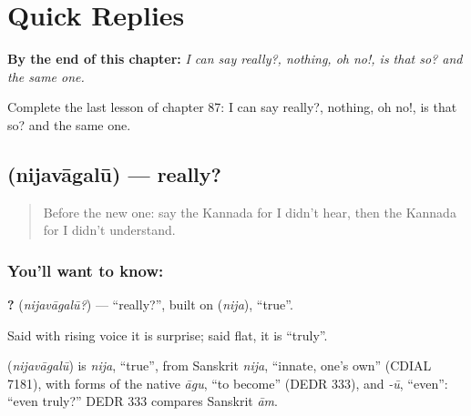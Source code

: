 
\chapter{Quick Replies}
\label{ch:ka-quick-replies}

\begin{chapteropening}
\textbf{By the end of this chapter:} \emph{I can say really?, nothing, oh no!, is that so? and the same one.}

Complete the last lesson of chapter 87: I can say really?, nothing, oh no!, is that so? and the same one.
\end{chapteropening}

\section[\texorpdfstring{\kn{ನಿಜವಾಗಲೂ} (nijavāgalū)}{ನಿಜವಾಗಲೂ (nijavāgalū)}]{ (nijavāgalū) — really?}

\label{lesson:KA-C87-really}



\begin{quote}
Before the new one: say the Kannada for I didn't hear, then the Kannada for I didn't understand.
\end{quote}

\subsection*{You'll want to know: }
\textbf{?} (\emph{nijavāgalū?}) — \textquotedblleft{}really?\textquotedblright{}, built on \textbf{} (\emph{nija}), \textquotedblleft{}true\textquotedblright{}.

Said with rising voice it is surprise; said flat, it is \textquotedblleft{}truly\textquotedblright{}.

\begin{cousinweb}
\textbf{} (\emph{nijavāgalū}) is \emph{nija}, \textquotedblleft{}true\textquotedblright{}, from Sanskrit \emph{nija}, \textquotedblleft{}innate, one's own\textquotedblright{} (CDIAL 7181), with forms of the native \emph{āgu}, \textquotedblleft{}to become\textquotedblright{} (DEDR 333), and \emph{-ū}, \textquotedblleft{}even\textquotedblright{}: \textquotedblleft{}even truly?\textquotedblright{} DEDR 333 compares Sanskrit \emph{ām}.
\end{cousinweb}

